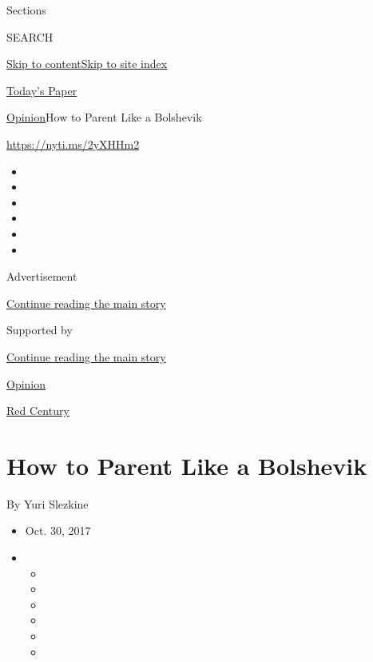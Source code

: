 Sections

SEARCH

\protect\hyperlink{site-content}{Skip to
content}\protect\hyperlink{site-index}{Skip to site index}

\href{https://myaccount.nytimes.com/auth/login?response_type=cookie\&client_id=vi}{}

\href{https://www.nytimes.com/section/todayspaper}{Today's Paper}

\href{/section/opinion}{Opinion}\textbar{}How to Parent Like a Bolshevik

\href{https://nyti.ms/2yXHHm2}{https://nyti.ms/2yXHHm2}

\begin{itemize}
\item
\item
\item
\item
\item
\item
\end{itemize}

Advertisement

\protect\hyperlink{after-top}{Continue reading the main story}

Supported by

\protect\hyperlink{after-sponsor}{Continue reading the main story}

\href{/section/opinion}{Opinion}

\href{/column/red-century}{Red Century}

\hypertarget{how-to-parent-like-a-bolshevik}{%
\section{How to Parent Like a
Bolshevik}\label{how-to-parent-like-a-bolshevik}}

By Yuri Slezkine

\begin{itemize}
\item
  Oct. 30, 2017
\item
  \begin{itemize}
  \item
  \item
  \item
  \item
  \item
  \item
  \end{itemize}
\end{itemize}

